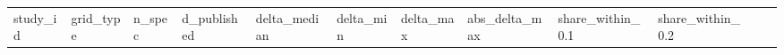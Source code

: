 {
\begin{longtable}[]{@{}
  >{\raggedright\arraybackslash}p{}
  >{\raggedright\arraybackslash}p{}
  >{\raggedright\arraybackslash}p{}
  >{\raggedright\arraybackslash}p{}
  >{\raggedright\arraybackslash}p{}
  >{\raggedright\arraybackslash}p{}
  >{\raggedright\arraybackslash}p{}
  >{\raggedright\arraybackslash}p{}
  >{\raggedright\arraybackslash}p{}
  >{\raggedright\arraybackslash}p{}
  >{\raggedright\arraybackslash}p{}
  >{\raggedright\arraybackslash}p{}@{}}
\toprule\noalign{}
\begin{minipage}[b]{\linewidth}\raggedright
study\_id
\end{minipage} & \begin{minipage}[b]{\linewidth}\raggedright
grid\_type
\end{minipage} & \begin{minipage}[b]{\linewidth}\raggedright
n\_spec
\end{minipage} & \begin{minipage}[b]{\linewidth}\raggedright
d\_published
\end{minipage} & \begin{minipage}[b]{\linewidth}\raggedright
delta\_median
\end{minipage} & \begin{minipage}[b]{\linewidth}\raggedright
delta\_min
\end{minipage} & \begin{minipage}[b]{\linewidth}\raggedright
delta\_max
\end{minipage} & \begin{minipage}[b]{\linewidth}\raggedright
abs\_delta\_max
\end{minipage} & \begin{minipage}[b]{\linewidth}\raggedright
share\_within\_0.1
\end{minipage} & \begin{minipage}[b]{\linewidth}\raggedright
share\_within\_0.2
\end{minipage} & \begin{minipage}[b]{\linewidth}\raggedright

\end{minipage}
\end{longtable}}
